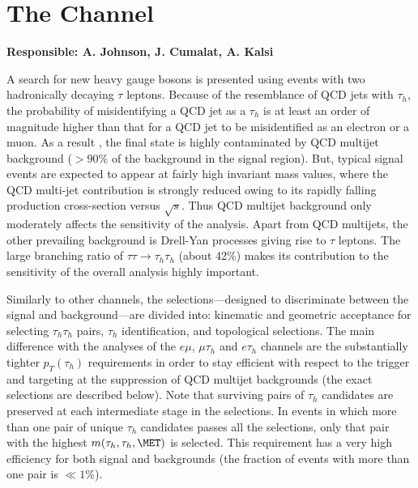 \chapter{The \ditauhad Channel}\label{sec:dihad}
\textbf{Responsible: A. Johnson, J. Cumalat, A. Kalsi}


A search for new heavy gauge bosons is presented using events with two hadronically decaying $\tau$ leptons. Because of the resemblance of QCD jets with $\tau_{h}$, the probability of misidentifying a QCD jet as a $\tau_{h}$ is at least an order of magnitude higher than that for a QCD jet to be misidentified as an electron or a muon. As a result , the final state is highly contaminated by QCD multijet background ($> 90\%$ of the background in the signal region). But, typical signal events are expected to appear at fairly high invariant mass values, where the QCD multi-jet contribution is strongly reduced owing to its rapidly falling production cross-section versus $\sqrt{s}$. Thus QCD multijet background only moderately affects the sensitivity of the analysis. Apart from QCD multijets, the other prevailing background is Drell-Yan processes giving rise to $\tau$ leptons. The large branching ratio of $\tau\tau \to \tau_{h}\tau_{h}$ (about 42\%) makes its contribution to the sensitivity of the overall analysis highly important.   

Similarly to other channels, the selections---designed to discriminate between the signal and background---are divided into: kinematic and geometric acceptance for selecting $\tau_{h}\tau_{h}$ pairs, $\tau_{h}$ identification, and topological selections. The main difference with the analyses of the $e\mu$, $\mu \tau_h$ and $e \tau_h$ channels are the substantially tighter $p_{T}(\tau_{h})$ requirements in order to stay efficient with respect to the trigger and targeting at the suppression of QCD multijet backgrounds (the exact selections are described below). Note that surviving pairs of $\tau_{h}$ candidates are preserved at each intermediate stage in the selections. In events in which more than one pair of unique $\tau_{h}$ candidates passes all the selections, only that pair with the highest $m(\tau_{h},\tau_{h},\MET)$ is selected. This requirement has a very high efficiency for both signal and backgrounds (the fraction of events with more than one pair is $\ll 1$\%).

